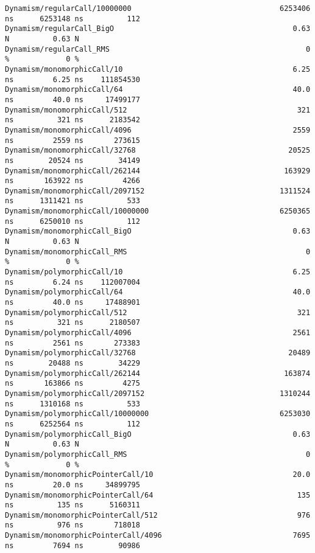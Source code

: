 \begin{code}
\begin{verbatim}
Dynamism/regularCall/10000000                                  6253406 ns      6253148 ns          112
Dynamism/regularCall_BigO                                         0.63 N          0.63 N
Dynamism/regularCall_RMS                                             0 %             0 %
Dynamism/monomorphicCall/10                                       6.25 ns         6.25 ns    111854530
Dynamism/monomorphicCall/64                                       40.0 ns         40.0 ns     17499177
Dynamism/monomorphicCall/512                                       321 ns          321 ns      2183542
Dynamism/monomorphicCall/4096                                     2559 ns         2559 ns       273615
Dynamism/monomorphicCall/32768                                   20525 ns        20524 ns        34149
Dynamism/monomorphicCall/262144                                 163929 ns       163922 ns         4266
Dynamism/monomorphicCall/2097152                               1311524 ns      1311421 ns          533
Dynamism/monomorphicCall/10000000                              6250365 ns      6250010 ns          112
Dynamism/monomorphicCall_BigO                                     0.63 N          0.63 N
Dynamism/monomorphicCall_RMS                                         0 %             0 %
Dynamism/polymorphicCall/10                                       6.25 ns         6.24 ns    112007004
Dynamism/polymorphicCall/64                                       40.0 ns         40.0 ns     17488901
Dynamism/polymorphicCall/512                                       321 ns          321 ns      2180507
Dynamism/polymorphicCall/4096                                     2561 ns         2561 ns       273383
Dynamism/polymorphicCall/32768                                   20489 ns        20488 ns        34229
Dynamism/polymorphicCall/262144                                 163874 ns       163866 ns         4275
Dynamism/polymorphicCall/2097152                               1310244 ns      1310168 ns          533
Dynamism/polymorphicCall/10000000                              6253030 ns      6252564 ns          112
Dynamism/polymorphicCall_BigO                                     0.63 N          0.63 N
Dynamism/polymorphicCall_RMS                                         0 %             0 %
Dynamism/monomorphicPointerCall/10                                20.0 ns         20.0 ns     34899795
Dynamism/monomorphicPointerCall/64                                 135 ns          135 ns      5160311
Dynamism/monomorphicPointerCall/512                                976 ns          976 ns       718018
Dynamism/monomorphicPointerCall/4096                              7695 ns         7694 ns        90986

\end{verbatim}
\end{code}
